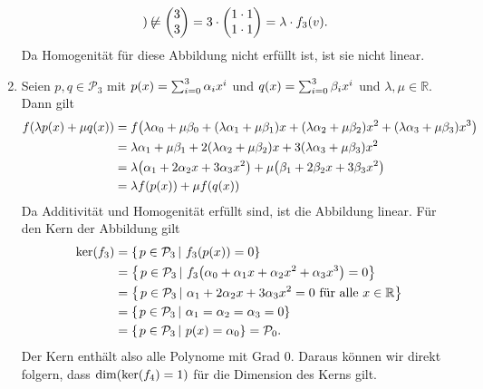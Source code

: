 \documentclass[german,12pt]{homework}
\newcommand{\RR}{\mathbb{R}}
\newcommand{\PP}{\mathcal{P}}
\DeclarePairedDelimiter{\enbrace}{(}{)}
\DeclarePairedDelimiter{\penbrace}{\{}{\}}
\begin{document}
\begin{enumerate}
\[\begin{pmatrix}
        \end{pmatrix} \ne \begin{pmatrix}3\\3\end{pmatrix} = 3 \cdot
        \begin{pmatrix}1 \cdot 1\\1 \cdot 1\end{pmatrix} = \lambda \cdot
        f_3\enbrace*{v}.\]
        Da Homogenität für diese Abbildung nicht erfüllt ist, ist sie nicht
        linear.
        \item Seien \(p, q \in \PP_3\) mit \(p\enbrace*{x} = \sum_{i = 0}^3
        \alpha_ix^i\) und \(q\enbrace*{x} = \sum_{i = 0}^3\beta_ix^i\) und
        \(\lambda, \mu \in \RR\). Dann gilt
        \begin{align*}
            f\enbrace*{\lambda{p\enbrace*{x}} + \mu{q\enbrace*{x}}} &=
            f\enbrace*{\lambda{\alpha_0} + \mu{\beta_0} +
            \enbrace*{\lambda{\alpha_1} + \mu{\beta_1}}x +
            \enbrace*{\lambda{\alpha_2} + \mu{\beta_2}}x^2 +
            \enbrace*{\lambda{\alpha_3} + \mu{\beta_3}}x^3}\\
            &= \lambda{\alpha_1} + \mu{\beta_1} + 2\enbrace*{\lambda{\alpha_2}
            + \mu{\beta_2}}x + 3\enbrace*{\lambda{\alpha_3} + \mu{\beta_3}}x^2\\
            &= \lambda\enbrace*{\alpha_1 + 2\alpha_2x + 3\alpha_3x^2} +
            \mu\enbrace*{\beta_1 + 2\beta_2x + 3\beta_3x^2}\\
            &= \lambda{f\enbrace*{p\enbrace*{x}}} +
            \mu{f\enbrace*{q\enbrace*{x}}}
        \end{align*}
        Da Additivität und Homogenität erfüllt sind, ist die Abbildung linear.
        Für den Kern der Abbildung gilt
        \begin{align*}
            \ker\enbrace*{f_3} &= \penbrace*{\left.p \in \PP_3\,\right|\,
            f_3\enbrace*{p\enbrace*{x}} = 0}\\
            &= \penbrace*{\left.p \in \PP_3\,\right|\,f_3\enbrace*{\alpha_0 +
            \alpha_1x + \alpha_2x^2 + \alpha_3x^3} = 0}\\
            &= \penbrace*{\left.p \in \PP_3\,\right|\,\alpha_1 + 2\alpha_2x +
            3\alpha_3x^2 = 0\text{ für alle }x \in \RR}\\
            &= \penbrace*{\left.p \in \PP_3\,\right|\,\alpha_1 = \alpha_2 =
            \alpha_3 = 0}\\
            &= \penbrace*{\left.p \in \PP_3\,\right|\,p\enbrace*{x} =
            \alpha_0} = \PP_0.
        \end{align*}
        Der Kern enthält also alle Polynome mit Grad \(0\). Daraus können wir
        direkt folgern, dass \(\dim\enbrace*{\ker\enbrace*{f_4} = 1}\) für die
        Dimension des Kerns gilt.
    \end{enumerate}
\end{document}

